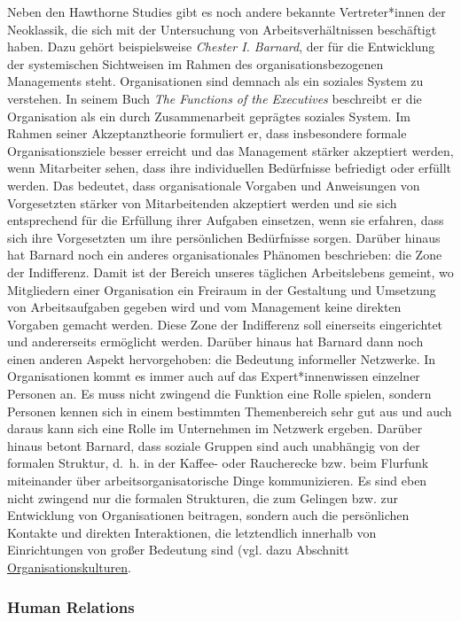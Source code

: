\documentclass[
  letterpaper,
]{book}
\begin{document}
Neben den Hawthorne Studies gibt es noch andere bekannte Vertreter*innen
der Neoklassik, die sich mit der Untersuchung von Arbeitsverhältnissen
beschäftigt haben. Dazu gehört beispielsweise \emph{Chester I. Barnard},
der für die Entwicklung der systemischen Sichtweisen im Rahmen des
organisationsbezogenen Managements steht. Organisationen sind demnach
als ein soziales System zu verstehen. In seinem Buch \emph{The Functions
of the Executives} beschreibt er die Organisation als ein durch
Zusammenarbeit geprägtes soziales System. Im Rahmen seiner
Akzeptanztheorie formuliert er, dass insbesondere formale
Organisationsziele besser erreicht und das Management stärker akzeptiert
werden, wenn Mitarbeiter sehen, dass ihre individuellen Bedürfnisse
befriedigt oder erfüllt werden. Das bedeutet, dass organisationale
Vorgaben und Anweisungen von Vorgesetzten stärker von Mitarbeitenden
akzeptiert werden und sie sich entsprechend für die Erfüllung ihrer
Aufgaben einsetzen, wenn sie erfahren, dass sich ihre Vorgesetzten um
ihre persönlichen Bedürfnisse sorgen. Darüber hinaus hat Barnard noch
ein anderes organisationales Phänomen beschrieben: die Zone der
Indifferenz. Damit ist der Bereich unseres täglichen Arbeitslebens
gemeint, wo Mitgliedern einer Organisation ein Freiraum in der
Gestaltung und Umsetzung von Arbeitsaufgaben gegeben wird und vom
Management keine direkten Vorgaben gemacht werden. Diese Zone der
Indifferenz soll einerseits eingerichtet und andererseits ermöglicht
werden. Darüber hinaus hat Barnard dann noch einen anderen Aspekt
hervorgehoben: die Bedeutung informeller Netzwerke. In Organisationen
kommt es immer auch auf das Expert*innenwissen einzelner Personen an. Es
muss nicht zwingend die Funktion eine Rolle spielen, sondern Personen
kennen sich in einem bestimmten Themenbereich sehr gut aus und auch
daraus kann sich eine Rolle im Unternehmen im Netzwerk ergeben. Darüber
hinaus betont Barnard, dass soziale Gruppen sind auch unabhängig von der
formalen Struktur, d.~h. in der Kaffee- oder Raucherecke bzw. beim
Flurfunk miteinander über arbeitsorganisatorische Dinge kommunizieren.
Es sind eben nicht zwingend nur die formalen Strukturen, die zum
Gelingen bzw. zur Entwicklung von Organisationen beitragen, sondern auch
die persönlichen Kontakte und direkten Interaktionen, die letztendlich
innerhalb von Einrichtungen von großer Bedeutung sind (vgl. dazu
Abschnitt \hyperref[organisationskultur]{Organisationskulturen}.

\subsubsection{Human Relations}\label{human-relations}
\end{document}
